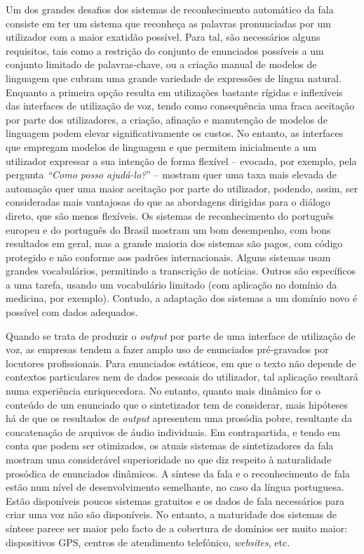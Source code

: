 \begin{multicols}{2}
 Um dos grandes desafios dos sistemas de re\-co\-nhe\-ci\-men\-to automático da fala consiste em ter um sistema que reconheça as palavras pronunciadas por um utilizador com a maior exatidão possível. Para tal, são necessários alguns requisitos, tais como a res\-tri\-ção do conjunto de enunciados possíveis a um conjunto limitado de palavras-chave, ou a criação manual de modelos de linguagem que cubram uma grande variedade de expressões de língua natural. Enquanto a primeira opção resulta em utilizações bastante rígidas e inflexíveis das interfaces de utilização de voz, tendo como consequência uma fraca aceitação por parte dos utilizadores, a criação, afinação e manutenção de modelos de linguagem podem elevar significativamente os custos. No entanto, as interfaces que empregam modelos de linguagem e que permitem inicialmente a um utilizador expressar a sua intenção de forma flexível – evocada, por exemplo, pela pergunta \textit{“Como posso ajudá-lo?}” – mostram quer uma taxa mais elevada de automação quer uma maior aceitação por parte do utilizador, podendo, assim, ser consideradas mais vantajosas do que as abordagens dirigidas para o diálogo direto, que são menos flexíveis. Os sistemas de reconhecimento do português europeu e do português do Brasil mostram um bom desempenho, com bons resultados em geral, mas a grande maioria dos sistemas são pagos, com código protegido e não conforme aos padrões internacionais. Alguns sistemas usam grandes vocabulários, permitindo a transcrição de notícias. Outros são específicos a uma tarefa, usando um vocabulário limitado (com aplicação no domínio da medicina, por exemplo). Contudo, a adaptação dos sistemas a um domínio novo é possível com dados adequados.

Quando se trata de produzir o \textit{output} por parte de uma interface de utilização de voz, as empresas tendem a fazer amplo uso de enunciados pré-gravados por locutores profissionais. Para enunciados estáticos, em que o texto não depende de contextos par\-ti\-cu\-la\-res nem de dados pessoais do utilizador, tal aplicação resultará numa experiência enriquecedora. No entanto, quanto mais dinâmico for o conteúdo de um enunciado que o sintetizador tem de considerar, mais hipóteses há de que os resultados de \textit{output} apresentem uma prosódia pobre, resultante da concatenação de arquivos de áudio individuais. Em contrapartida, e tendo em conta que podem ser otimizados, os atuais sistemas de sintetizadores da fala mostram uma considerável superioridade no que diz respeito à naturalidade prosódica de enunciados dinâmicos. A síntese da fala e o reconhecimento de fala estão num nível de desenvolvimento semelhante, no caso da língua portuguesa. Estão disponíveis poucos sistemas gratuitos e os dados de fala necessários para criar uma voz não são disponíveis. No entanto, a maturidade dos sistemas de síntese parece ser maior pelo facto de a cobertura de domínios ser muito maior: dispositivos GPS, centros de atendimento telefónico, \textit{websites}, etc.


\end{multicols}
